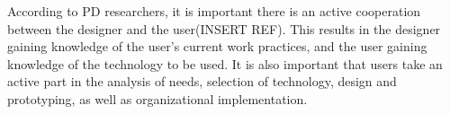 According to PD researchers, it is important there is an active cooperation between the designer and the user(INSERT REF). This results in the designer gaining knowledge of the user's current work practices, and the user gaining knowledge of the technology to be used. It is also important that users take an active part in the analysis of needs, selection of technology, design and prototyping, as well as organizational implementation.